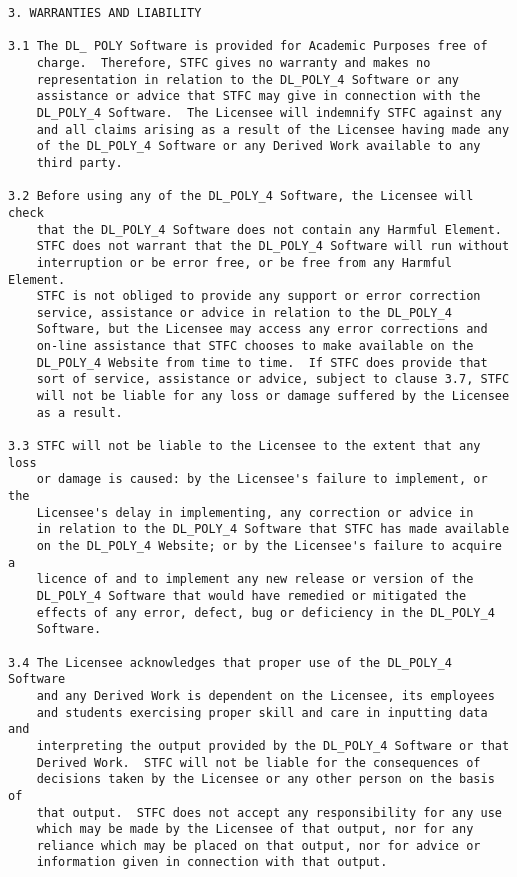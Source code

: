 \begin{verbatim}
3. WARRANTIES AND LIABILITY

3.1 The DL_ POLY Software is provided for Academic Purposes free of
    charge.  Therefore, STFC gives no warranty and makes no
    representation in relation to the DL_POLY_4 Software or any
    assistance or advice that STFC may give in connection with the
    DL_POLY_4 Software.  The Licensee will indemnify STFC against any
    and all claims arising as a result of the Licensee having made any
    of the DL_POLY_4 Software or any Derived Work available to any
    third party.

3.2 Before using any of the DL_POLY_4 Software, the Licensee will check
    that the DL_POLY_4 Software does not contain any Harmful Element.
    STFC does not warrant that the DL_POLY_4 Software will run without
    interruption or be error free, or be free from any Harmful Element.
    STFC is not obliged to provide any support or error correction
    service, assistance or advice in relation to the DL_POLY_4
    Software, but the Licensee may access any error corrections and
    on-line assistance that STFC chooses to make available on the
    DL_POLY_4 Website from time to time.  If STFC does provide that
    sort of service, assistance or advice, subject to clause 3.7, STFC
    will not be liable for any loss or damage suffered by the Licensee
    as a result.

3.3 STFC will not be liable to the Licensee to the extent that any loss
    or damage is caused: by the Licensee's failure to implement, or the
    Licensee's delay in implementing, any correction or advice in
    in relation to the DL_POLY_4 Software that STFC has made available
    on the DL_POLY_4 Website; or by the Licensee's failure to acquire a
    licence of and to implement any new release or version of the
    DL_POLY_4 Software that would have remedied or mitigated the
    effects of any error, defect, bug or deficiency in the DL_POLY_4
    Software.

3.4 The Licensee acknowledges that proper use of the DL_POLY_4 Software
    and any Derived Work is dependent on the Licensee, its employees
    and students exercising proper skill and care in inputting data and
    interpreting the output provided by the DL_POLY_4 Software or that
    Derived Work.  STFC will not be liable for the consequences of
    decisions taken by the Licensee or any other person on the basis of
    that output.  STFC does not accept any responsibility for any use
    which may be made by the Licensee of that output, nor for any
    reliance which may be placed on that output, nor for advice or
    information given in connection with that output.


\end{verbatim}
